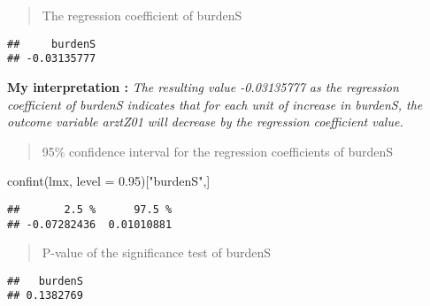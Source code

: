 \documentclass[
]{article}
\newenvironment{Shaded}{\begin{snugshade}}{\end{snugshade}}
\newcommand{\AttributeTok}[1]{\textcolor[rgb]{0.77,0.63,0.00}{#1}}
\newcommand{\DecValTok}[1]{\textcolor[rgb]{0.00,0.00,0.81}{#1}}
\newcommand{\FloatTok}[1]{\textcolor[rgb]{0.00,0.00,0.81}{#1}}
\newcommand{\FunctionTok}[1]{\textcolor[rgb]{0.00,0.00,0.00}{#1}}
\newcommand{\NormalTok}[1]{#1}
\newcommand{\SpecialCharTok}[1]{\textcolor[rgb]{0.00,0.00,0.00}{#1}}
\newcommand{\StringTok}[1]{\textcolor[rgb]{0.31,0.60,0.02}{#1}}
\begin{document}
\begin{quote}
The regression coefficient of burdenS
\end{quote}

\begin{Shaded}
\end{Shaded}

\begin{verbatim}
##     burdenS 
## -0.03135777
\end{verbatim}

\textbf{My interpretation :} \emph{The resulting value -0.03135777 as
the regression coefficient of burdenS indicates that for each unit of
increase in burdenS, the outcome variable arztZ01 will decrease by the
regression coefficient value.}

\begin{quote}
95\% confidence interval for the regression coefficients of burdenS
\end{quote}

\begin{Shaded}
\begin{Highlighting}[]
\FunctionTok{confint}\NormalTok{(lmx, }\AttributeTok{level =} \FloatTok{0.95}\NormalTok{)[}\StringTok{"burdenS"}\NormalTok{,]}
\end{Highlighting}
\end{Shaded}

\begin{verbatim}
##       2.5 %      97.5 % 
## -0.07282436  0.01010881
\end{verbatim}

\begin{quote}
P-value of the significance test of burdenS
\end{quote}

\begin{Shaded}
\end{Shaded}

\begin{verbatim}
##   burdenS 
## 0.1382769
\end{verbatim}
\end{document}
